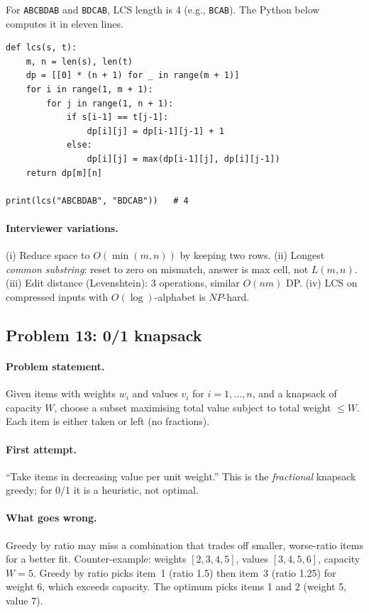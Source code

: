For \texttt{ABCBDAB} and \texttt{BDCAB}, LCS length is 4 (e.g.,
\texttt{BCAB}).  The Python below computes it in eleven lines.

\begin{lstlisting}[caption={Longest common subsequence by dynamic programming.}]
def lcs(s, t):
    m, n = len(s), len(t)
    dp = [[0] * (n + 1) for _ in range(m + 1)]
    for i in range(1, m + 1):
        for j in range(1, n + 1):
            if s[i-1] == t[j-1]:
                dp[i][j] = dp[i-1][j-1] + 1
            else:
                dp[i][j] = max(dp[i-1][j], dp[i][j-1])
    return dp[m][n]

print(lcs("ABCBDAB", "BDCAB"))   # 4
\end{lstlisting}

\paragraph{Interviewer variations.}
(i) Reduce space to $O(\min(m,n))$ by keeping two rows.  (ii)
Longest \emph{common substring}: reset to zero on mismatch, answer
is max cell, not $L(m,n)$.  (iii) Edit distance (Levenshtein): 3
operations, similar $O(nm)$ DP.  (iv) LCS on compressed inputs
with $O(\log)$-alphabet is $NP$-hard.

\subsection{Problem 13: 0/1 knapsack}
\label{sec:knapsack}

\paragraph{Problem statement.}
Given items with weights $w_i$ and values $v_i$ for
$i = 1, \dots, n$, and a knapsack of capacity $W$, choose a
subset maximising total value subject to total weight
$\le W$.  Each item is either taken or left (no fractions).

\paragraph{First attempt.}
``Take items in decreasing value per unit weight.''  This is the
\emph{fractional} knapsack greedy; for 0/1 it is a heuristic,
not optimal.

\paragraph{What goes wrong.}
Greedy by ratio may miss a combination that trades off smaller,
worse-ratio items for a better fit.  Counter-example: weights
$[2, 3, 4, 5]$, values $[3, 4, 5, 6]$, capacity $W = 5$.  Greedy
by ratio picks item~1 (ratio 1.5) then item~3 (ratio 1.25) for
weight 6, which exceeds capacity.  The optimum picks items 1 and
2 (weight 5, value 7).

